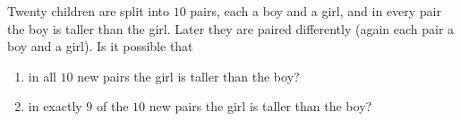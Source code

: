 Twenty children are split into $10$ pairs, each a boy and a girl, and in every pair the boy is taller than the girl. Later they are paired differently (again each pair a boy and a girl). Is it possible that
\begin{enumerate}
\item in all $10$ new pairs the girl is taller than the boy?
\item in exactly $9$ of the $10$ new pairs the girl is taller than the boy?
\end{enumerate}
